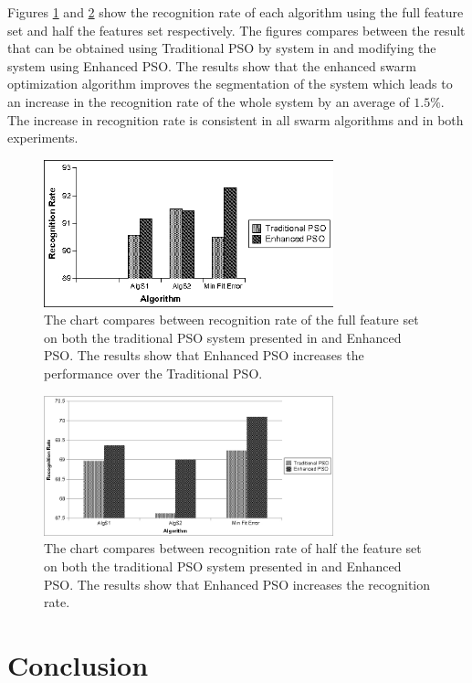 \documentclass[12pt,1p,times]{elsarticle}%
\begin{document}
Figures \ref{exp2} and \ref{exp1} show the recognition rate of each algorithm using the full feature set and half the features set respectively. The figures compares between the result that can be obtained using Traditional PSO by system in \cite{mypaper} and modifying the system using Enhanced PSO. The results show that the enhanced swarm optimization algorithm improves the segmentation of the system which leads to an increase in the recognition rate of the whole system by an average of $1.5\%$.  The increase in recognition rate is consistent in all swarm algorithms and in both experiments.   
    \begin{figure}
  \centering
  \includegraphics[width=3.3in]{Experiment_92.jpg}
  \caption[Recognition accuracy]%
  {The chart compares between recognition rate of the full feature set on both the traditional PSO system presented in \cite{mypaper} and Enhanced PSO. The results show that Enhanced PSO increases the performance over the  Traditional PSO. }
   \label{exp2}
\end{figure}
\begin{figure}
  \centering
  \includegraphics[width=3.3in]{Experiment_68.jpg}
  \caption[Recognition accuracy]%
  {The chart compares between recognition rate of half the feature set on both the traditional PSO system presented in \cite{mypaper} and Enhanced PSO. The results show that Enhanced PSO increases the recognition rate. }
   \label{exp1}
\end{figure}

 
  
\section{Conclusion }
 \label{ConclusionandFutureWork}
\end{document}

